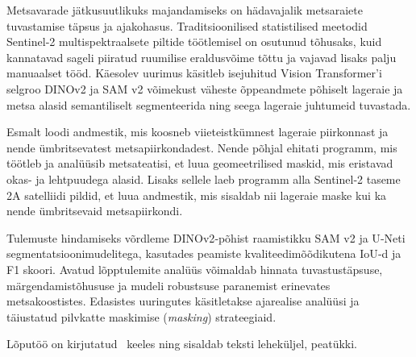 Metsavarade jätkusuutlikuks majandamiseks on hädavajalik metsaraiete tuvastamise täpsus ja ajakohasus. Traditsioonilised statistilised meetodid Sentinel‑2 multispektraalsete piltide töötlemisel on osutunud tõhusaks, kuid kannatavad sageli piiratud ruumilise eraldusvõime tõttu ja vajavad lisaks palju manuaalset tööd. Käesolev uurimus käsitleb isejuhitud Vision Transformer’i selgroo DINOv2 ja  SAM v2 võimekust väheste õppeandmete põhiselt lageraie ja metsa alasid semantiliselt segmenteerida ning seega lageraie juhtumeid tuvastada.

Esmalt loodi andmestik, mis koosneb viieteistkümnest lageraie piirkonnast ja nende ümbritsevatest metsapiirkondadest. Nende põhjal ehitati programm, mis töötleb ja analüüsib metsateatisi, et luua geomeetrilised maskid, mis eristavad okas- ja lehtpuudega alasid. Lisaks sellele laeb programm alla Sentinel‑2 taseme 2A satelliidi pildid, et luua andmestik, mis sisaldab nii lageraie maske kui ka nende ümbritsevaid metsapiirkondi.

Tulemuste hindamiseks võrdleme DINOv2‑põhist raamistikku SAM v2 ja U‑Neti segmentatsioonimudelitega, kasutades peamiste kvaliteedimõõdikutena IoU‑d ja F1 skoori. Avatud lõpptulemite analüüs võimaldab hinnata tuvastustäpsuse, märgendamistõhususe ja mudeli robustsuse paranemist erinevates metsakoostistes. Edasistes uuringutes käsitletakse ajarealise analüüsi ja täiustatud pilvkatte maskimise (\textit{masking}) strateegiaid.

Lõputöö on kirjutatud \langEst~keeles ning sisaldab teksti \calculatepages leheküljel, 
 peatükki.
